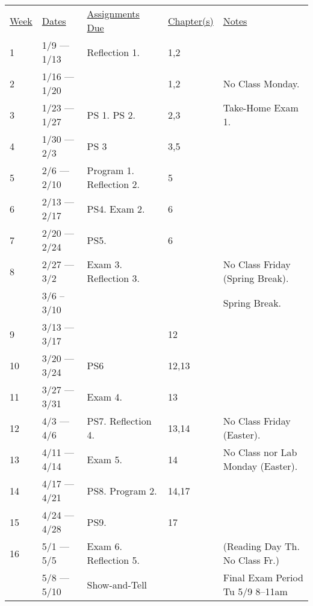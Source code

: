\documentclass[10pt]{article}
\begin{document}
\begin{center}
\begin{tabular}{lllll}
\underline{Week} & \underline{Dates} & \underline{Assignments Due} & \underline{Chapter(s)} & \underline{Notes} \\
1 & 1/9 --- 1/13  & Reflection 1. & 1,2 & \\
2 & 1/16 --- 1/20 &  & 1,2 & No Class Monday. \\
3 & 1/23 --- 1/27 & PS 1. PS 2.  & 2,3 & Take-Home Exam 1. \\
4 & 1/30 --- 2/3  & PS 3  &  3,5 & \\
5 & 2/6 --- 2/10 & Program 1. Reflection 2. & 5 & \\
6 & 2/13 --- 2/17 & PS4. Exam 2. & 6 & \\
7 & 2/20 --- 2/24 & PS5.  &  6 &\\
8 & 2/27 --- 3/2 & Exam 3. Reflection 3. & & No Class Friday (Spring Break).  \\
  &  3/6 -- 3/10 & & & Spring Break. \\
9 & 3/13 --- 3/17  & & 12 &  \\
10 & 3/20 --- 3/24  & PS6 & 12,13 & \\
11 & 3/27 --- 3/31 & Exam 4. & 13 & \\
12 & 4/3 --- 4/6 &  PS7. Reflection 4. & 13,14 & No Class Friday (Easter).  \\
13 & 4/11 --- 4/14 & Exam 5. & 14 & No Class nor Lab Monday (Easter). \\
14 & 4/17 --- 4/21 & PS8. Program 2. & 14,17 & \\
15 & 4/24 --- 4/28 & PS9. & 17 & \\
16 & 5/1 --- 5/5 & Exam 6. Reflection 5. & & (Reading Day Th. No Class Fr.) \\
   & 5/8 --- 5/10 & Show-and-Tell & & Final Exam Period Tu 5/9 8--11am \\
\end{tabular}
\end{center}
\end{document}
